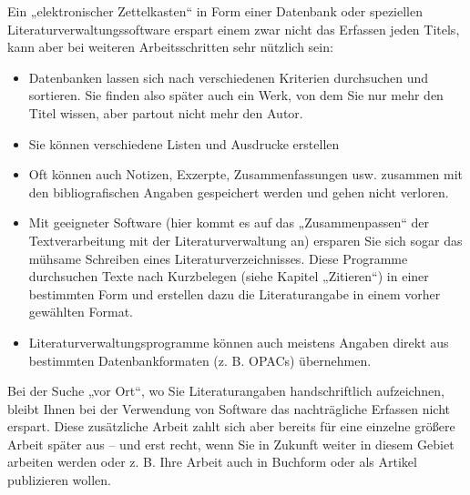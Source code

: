 \documentclass[]{book}
\providecommand{\tightlist}{%
  \setlength{\itemsep}{0pt}\setlength{\parskip}{0pt}}
\theoremstyle{definition}
\theoremstyle{definition}
\theoremstyle{definition}
\theoremstyle{remark}
\begin{document}
Ein „elektronischer Zettelkasten`` in Form einer Datenbank oder
speziellen Literaturverwaltungssoftware erspart einem zwar nicht das
Erfassen jeden Titels, kann aber bei weiteren Arbeitsschritten sehr
nützlich sein:

\begin{itemize}
\tightlist
\item
  Datenbanken lassen sich nach verschiedenen Kriterien durchsuchen und
  sortieren. Sie finden also später auch ein Werk, von dem Sie nur mehr
  den Titel wissen, aber partout nicht mehr den Autor.
\item
  Sie können verschiedene Listen und Ausdrucke erstellen
\item
  Oft können auch Notizen, Exzerpte, Zusammenfassungen usw. zusammen mit
  den bibliografischen Angaben gespeichert werden und gehen nicht
  verloren.
\item
  Mit geeigneter Software (hier kommt es auf das „Zusammenpassen`` der
  Textverarbeitung mit der Literaturverwaltung an) ersparen Sie sich
  sogar das mühsame Schreiben eines Literaturverzeichnisses. Diese
  Programme durchsuchen Texte nach Kurzbelegen (siehe Kapitel
  „Zitieren``) in einer bestimmten Form und erstellen dazu die
  Literaturangabe in einem vorher gewählten Format.
\item
  Literaturverwaltungsprogramme können auch meistens Angaben direkt aus
  bestimmten Datenbankformaten (z. B. OPACs) übernehmen.
\end{itemize}

Bei der Suche „vor Ort``, wo Sie Literaturangaben handschriftlich
aufzeichnen, bleibt Ihnen bei der Verwendung von Software das
nachträgliche Erfassen nicht erspart. Diese zusätzliche Arbeit zahlt
sich aber bereits für eine einzelne größere Arbeit später aus -- und
erst recht, wenn Sie in Zukunft weiter in diesem Gebiet arbeiten werden
oder z. B. Ihre Arbeit auch in Buchform oder als Artikel publizieren
wollen.
\end{document}
